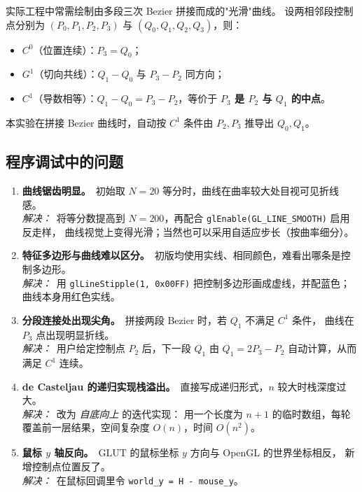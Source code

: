 \documentclass[a4paper,12pt]{ctexart}
\begin{document}
实际工程中常需绘制由多段三次 Bezier 拼接而成的"光滑"曲线。
设两相邻段控制点分别为 $(P_0,P_1,P_2,P_3)$ 与 $(Q_0,Q_1,Q_2,Q_3)$，则：
\begin{itemize}[leftmargin=2em,itemsep=0.1em]
    \item $C^0$（位置连续）：$P_3 = Q_0$；
    \item $G^1$（切向共线）：$Q_1 - Q_0$ 与 $P_3 - P_2$ 同方向；
    \item $C^1$（导数相等）：$Q_1 - Q_0 = P_3 - P_2$，等价于 \textbf{$P_3$ 是 $P_2$ 与 $Q_1$ 的中点}。
\end{itemize}
本实验在拼接 Bezier 曲线时，自动按 $C^1$ 条件由 $P_2,P_3$ 推导出 $Q_0,Q_1$。

\subsection{程序调试中的问题}

\begin{enumerate}[leftmargin=2em,itemsep=0.4em]
    \item \textbf{曲线锯齿明显。}\ 初始取 $N=20$ 等分时，曲线在曲率较大处目视可见折线感。\\
        \textit{解决：}\ 将等分数提高到 $N=200$，再配合 \texttt{glEnable(GL\_LINE\_SMOOTH)} 启用反走样，
        曲线视觉上变得光滑；当然也可以采用自适应步长（按曲率细分）。

    \item \textbf{特征多边形与曲线难以区分。}\ 初版均使用实线、相同颜色，难看出哪条是控制多边形。\\
        \textit{解决：}\ 用 \texttt{glLineStipple(1, 0x00FF)} 把控制多边形画成虚线，并配蓝色；曲线本身用红色实线。

    \item \textbf{分段连接处出现尖角。}\ 拼接两段 Bezier 时，若 $Q_1$ 不满足 $C^1$ 条件，
        曲线在 $P_3$ 点出现明显折线。\\
        \textit{解决：}\ 用户给定控制点 $P_2$ 后，下一段 $Q_1$ 由
        $Q_1 = 2P_3 - P_2$ 自动计算，从而满足 $C^1$ 连续。

    \item \textbf{de Casteljau 的递归实现栈溢出。}\ 直接写成递归形式，$n$ 较大时栈深度过大。\\
        \textit{解决：}\ 改为 \emph{自底向上} 的迭代实现：
        用一个长度为 $n+1$ 的临时数组，每轮覆盖前一层结果，空间复杂度 $O(n)$，时间 $O(n^2)$。

    \item \textbf{鼠标 $y$ 轴反向。}\ GLUT 的鼠标坐标 $y$ 方向与 OpenGL 的世界坐标相反，
        新增控制点位置反了。\\
        \textit{解决：}\ 在鼠标回调里令 \texttt{world\_y = H - mouse\_y}。
\end{enumerate}
\end{document}
